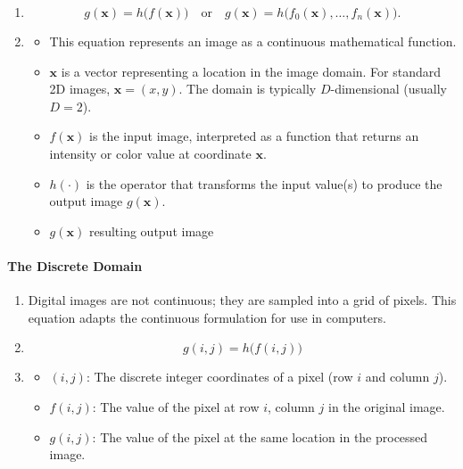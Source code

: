 \documentclass[12pt]{article}
\begin{document}
\begin{enumerate}
    \item \begin{equation}
              g(\mathbf{x}) = h\big(f(\mathbf{x})\big)
              \quad \text{or} \quad
              g(\mathbf{x}) = h\big(f_0(\mathbf{x}), \dots, f_n(\mathbf{x})\big).
          \end{equation}
    \item \begin{itemize}
              \item This equation represents an image as a continuous mathematical function.
              \item $\mathbf{x}$ is a vector representing a location in the image domain. For standard 2D images, $\mathbf{x} = (x, y)$. The domain is typically $D$-dimensional (usually $D = 2$).
              \item $f(\mathbf{x})$ is the input image, interpreted as a function that returns an intensity or color value at coordinate $\mathbf{x}$.
              \item $h(\cdot)$ is the operator that transforms the input value(s) to produce the output image $g(\mathbf{x})$.
              \item $g(\mathbf{x})$ resulting output image
          \end{itemize}

\end{enumerate}


\paragraph{The Discrete Domain}

\begin{enumerate}
    \item Digital images are not continuous; they are sampled into a grid of pixels. This equation adapts the continuous formulation for use in computers.
    \item \[
              g(i,j) = h\big(f(i,j)\big)
          \]
    \item \begin{itemize}
              \item $(i,j)$: The discrete integer coordinates of a pixel (row $i$ and column $j$).
              \item $f(i,j)$: The value of the pixel at row $i$, column $j$ in the original image.
              \item $g(i,j)$: The value of the pixel at the same location in the processed image.
          \end{itemize}

\end{enumerate}
\end{document}
